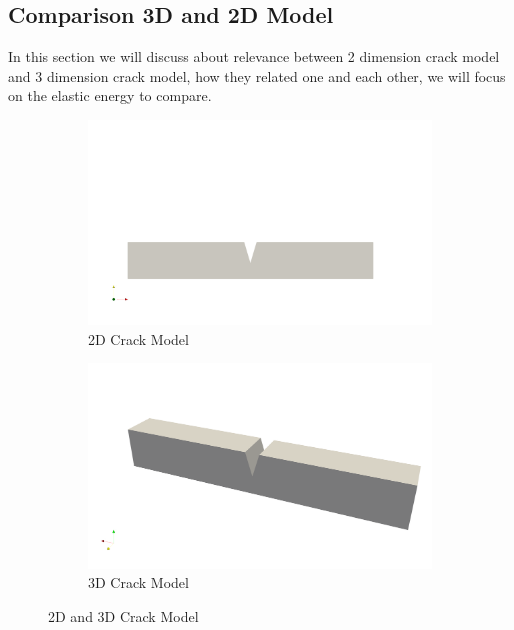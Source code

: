 \documentclass[a4paper,11pt]{article}
\begin{document}
\subsection{Comparison 3D and 2D Model}
In this section we will discuss about relevance between 2 dimension crack model and 3 dimension crack model, how they related one and each other, we will focus on the elastic energy to compare.
\begin{figure}[h!]
	\begin{subfigure}[b]{0.49\linewidth}
		\centering
		\includegraphics[width=\linewidth]{picture/conference/2d-crack-model}
		\caption{2D Crack Model}
		\label{fig:2d-crack-model}
	\end{subfigure}
	\begin{subfigure}[b]{0.49\linewidth}
		\centering
		\includegraphics[width=\linewidth]{picture/conference/3d-crack-model}
		\caption{3D Crack Model}
		\label{fig:3d-crack-model}
	\end{subfigure}
	\caption{2D and 3D Crack Model}
	\label{fig:compare2d3d}
\end{figure}
\end{document}

